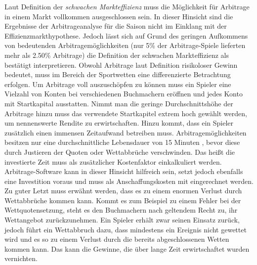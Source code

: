 Laut Definition der \textit{schwachen Markteffizienz} muss die Möglichkeit für Arbitrage in einem Markt vollkommen ausgeschlossen sein. In dieser Hinsicht sind die Ergebnisse der Arbitrageanalyse für die Saison nicht im Einklang mit der Effizienzmarkthypothese. Jedoch lässt sich auf Grund des geringen Aufkommens von bedeutenden Arbitragemöglichkeiten (nur 5\% der Arbitrage-Spiele lieferten mehr als 2.50\% Arbitrage) die Definition der schwachen Markteffizienz als bestätigt interpretieren. Obwohl Arbitrage laut Definition risikoloser Gewinn bedeutet, muss im Bereich der Sportwetten eine differenzierte Betrachtung erfolgen. Um Arbitrage voll auszuschöpfen zu können muss ein Spieler eine Vielzahl von Konten bei verschiedenen Buchmachern eröffnen und jedes Konto mit Startkapital ausstatten. Nimmt man die geringe Durchschnittshöhe der Arbitrage hinzu muss das verwendete Startkapitel extrem hoch gewählt werden, um nennenswerte Rendite zu erwirtschaften. Hinzu kommt, dass ein Spieler zusätzlich einen immensen Zeitaufwand betreiben muss. Arbitragemöglichkeiten besitzen nur eine durchschnittliche Lebensdauer von 15 Minuten \citep{marshall2009quickly}, bevor diese durch Justieren der Quoten oder Wettabbrüche verschwinden. Das heißt die investierte Zeit muss als zusätzlicher Kostenfaktor einkalkuliert werden. Arbitrage-Software kann in dieser Hinsicht hilfreich sein, setzt jedoch ebenfalls eine Investition voraus und muss als Anschaffungskosten mit eingerechnet werden. Zu guter Letzt muss erwähnt werden, dass es zu einem enormen Verlust durch Wettabbrüche kommen kann. Kommt es zum Beispiel zu einem Fehler bei der Wettquotensetzung, steht es den Buchmachern nach geltendem Recht zu, ihr Wettangebot zurückzunehmen. Ein Spieler erhält zwar seinen Einsatz zurück, jedoch führt ein Wettabbruch dazu, dass mindestens ein Ereignis nicht gewettet wird und es so zu einem Verlust durch die bereits abgeschlossenen Wetten kommen kann. Das kann die Gewinne, die über lange Zeit erwirtschaftet wurden vernichten.

